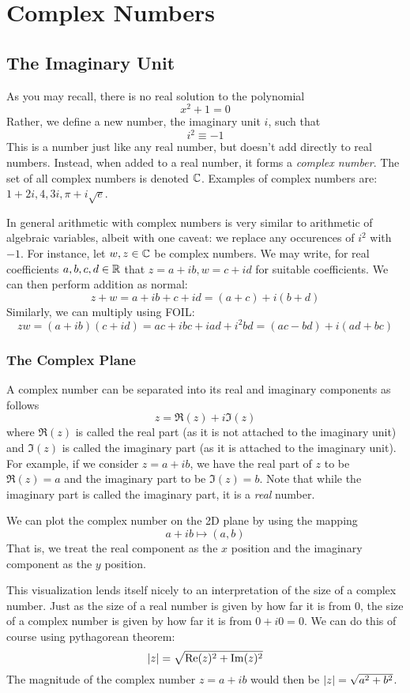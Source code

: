 \chapter{Complex Numbers}
\section{The Imaginary Unit}
As you may recall, there is no real solution to the polynomial 
\[x^2+1=0\]
Rather, we define a new number, the imaginary unit \(i\), such that
\[i^2\equiv-1\]
This is a number just like any real number, but doesn't add directly to real numbers. Instead, when added to a real number, it forms a \emph{complex number}. The set of all complex numbers is denoted \(\mathbb{C}\). Examples of complex numbers are: \(1+2i, 4, 3i, \pi+i\sqrt{e}\).

In general arithmetic with complex numbers is very similar to arithmetic of algebraic variables, albeit with one caveat: we replace any occurences of \(i^2\) with \(-1\). For instance, let \(w,z\in\mathbb{C}\) be complex numbers. We may write, for real coefficients \(a,b,c,d\in\mathbb{R}\) that \(z=a+ib, w= c+id\) for suitable coefficients. We can then perform addition as normal:
\[z+w = a+ib + c+id = (a+c) + i(b+d)\]
Similarly, we can multiply using FOIL:\@
\[zw = (a+ib)(c+id) = ac + ibc + iad + i^2bd = (ac-bd) +i(ad+bc)\]

\subsection{The Complex Plane}
A complex number can be separated into its real and imaginary components as follows
\begin{equation}
	z = \Re(z) + i\Im(z)
\end{equation}
where \(\Re(z)\) is called the real part (as it is not attached to the imaginary unit) and \(\Im(z)\) is called the imaginary part (as it is attached to the imaginary unit). For example, if we consider \(z = a+ib\), we have the real part of \(z\) to be \(\Re(z)=a\) and the imaginary part to be \(\Im(z) = b\). Note that while the imaginary part is called the imaginary part, it is a \emph{real} number. 

We can plot the complex number on the 2D plane by using the mapping
\[a+ib \mapsto (a,b)\]
That is, we treat the real component as the \(x\) position and the imaginary component as the \(y\) position.

This visualization lends itself nicely to an interpretation of the size of a complex number. Just as the size of a real number is given by how far it is from 0, the size of a complex number is given by how far it is from \(0+i0 = 0\). We can do this of course using pythagorean theorem:
\begin{equation}
	\left|z\right| = \sqrt{\operatorname{Re}(z)^2+\operatorname{Im}(z)^2}
\end{equation}
The magnitude of the complex number \(z=a+ib\) would then be \(\left|z\right| = \sqrt{a^2+b^2}\).

